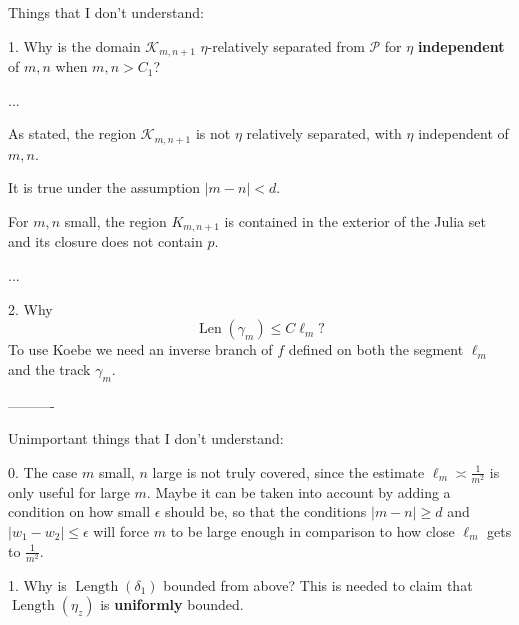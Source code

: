 Things that I don't understand:

1. Why is the domain $\mathcal K_{m,n+1}$ $\eta$-relatively separated from $\mathcal P$ for $\eta$ \textbf{independent} of $m,n$ when $m,n>C_1$?

...

As stated, the region  $\mathcal K_{m,n+1}$ is not $\eta$ relatively separated, with $\eta$ independent of $m, n$. 

It is true under the assumption $|m-n| < d$.

For $m, n$ small, the region $K_{m,n+1}$ is contained in the exterior of the Julia set and its closure does not contain $p$.

...

2. Why $$\operatorname{Len}(\gamma_m) \leq C \ell_m?$$
To use Koebe we need an inverse branch of $f$ defined on both the segment $\ell_m$ and the track $\gamma_m$.

----------

Unimportant things that I don't understand:

0. The case $m$ small, $n$ large is not truly covered, since the estimate $\ell_m \asymp \frac 1{m^2}$ is only useful for large $m$. 
Maybe it can be taken into account by adding a condition on how small $\epsilon$ should be, so that the conditions $|m-n| \geq d$ and $|w_1-w_2| \leq \epsilon$ will force $m$ to be large enough in comparison to how close $\ell _m$ gets to $\frac 1{m^2}$.

1. Why is $\operatorname{Length}(\delta_1)$ bounded from above? This is needed to claim that $\operatorname{Length}(\eta_z)$ is \textbf{uniformly} bounded.
